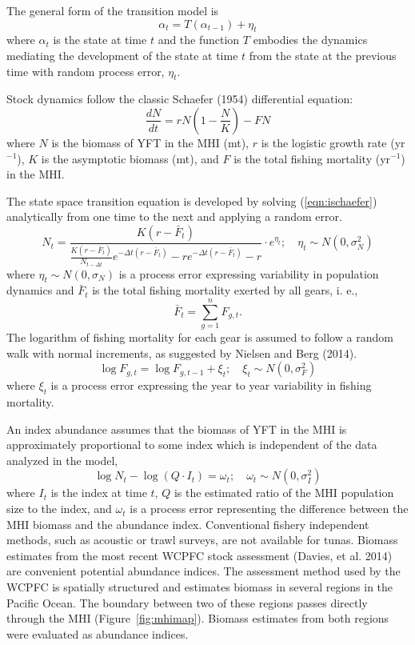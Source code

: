 \documentclass[12pt,letterpaper]{article}
\newcommand\peryr{yr$^{-1}$}
\begin{document}
The general form of the transition model is
\begin{equation}
\alpha_t=T(\alpha_{t-1}) + \eta_t
\end{equation}
where $\alpha_t$ is the state at time $t$ and 
the function $T$ embodies the dynamics mediating the
development of the state at time $t$ from the state at the previous
time with random process error, $\eta_t$.

Stock dynamics follow the classic Schaefer (1954) differential equation:
\begin{equation}
\label{eqn:ischaefer}
\frac{dN}{dt} = rN(1-\frac{N}{K}) - FN
\end{equation}
where $N$ is the biomass of YFT in the MHI (mt), 
$r$ is the logistic growth rate (\peryr),
$K$ is the asymptotic biomass (mt), and
$F$ is the total fishing mortality (\peryr) in the MHI.

The state space transition equation is developed by solving
(\ref{eqn:ischaefer}) analytically from one time to the next and
applying a random error.
\begin{equation}
\label{eqn:intschaeferA}
N_t = \frac{K(r-\bar{F}_t)}{\frac{K(r-\bar{F}_t)}{N_{t-\Delta t}}e^{-\Delta
t(r-\bar{F}_t)}-re^{-\Delta t(r-\bar{F}_t)} -r} \cdot e^{\eta_t};
\quad \eta_t\sim N(0,\sigma^2_N)
\end{equation}
where $\eta_t \sim N(0,\sigma_N)$ is a process error expressing
variability in population dynamics
and $\bar{F}_t$ is the total fishing mortality exerted by all gears, i. e.,
$$
\bar{F}_t =\sum_{g=1}^n F_{g,t}.
$$
The logarithm of fishing mortality for each gear is assumed to
follow a random walk with normal increments, as suggested by Nielsen
and Berg (2014).
\begin{equation}
\label{eqn:Fwalk}
\log F_{g,t} = \log F_{g,t-1} + \xi_t;\quad \xi_t\sim
N(0,\sigma^2_F)
\end{equation}
where  $\xi_t$ is a process error expressing the year to year
variability in fishing mortality.

An index abundance assumes that the biomass of YFT in the MHI
is approximately proportional to some index which is independent of
the data analyzed in the model,
\begin{equation}
\log N_t - \log (Q\cdot I_t) = \omega_t;\quad \omega_t\sim N(0,\sigma^2_I)
\label{eqn:index}
\end{equation}
where
$I_t$ is the index at time $t$,
$Q$ is the estimated ratio of the MHI population size to the index,
and $\omega_t$ is a process error representing the difference
between the MHI biomass and the abundance index. 
Conventional fishery independent methods, such as acoustic or trawl
surveys, are not available for tunas. 
Biomass estimates from the most recent WCPFC stock
assessment (Davies, et al. 2014) are convenient potential abundance
indices. The assessment method used by the
WCPFC is spatially structured and estimates biomass in several regions
in the Pacific Ocean. The boundary between two of these
regions passes directly through the MHI (Figure~\ref{fig:mhimap}).
Biomass estimates from both regions were evaluated as abundance indices.
\end{document}
